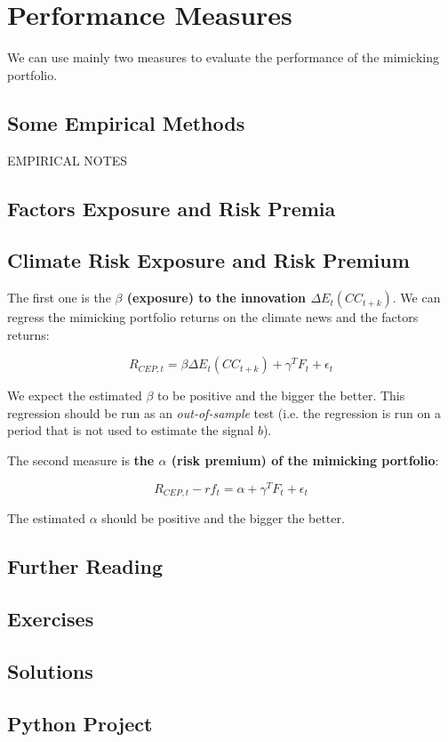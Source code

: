 \chapter{Performance Measures}

We can use mainly two measures to evaluate the performance of the mimicking portfolio. 

\section{Some Empirical Methods}

EMPIRICAL NOTES

\section{Factors Exposure and Risk Premia}

\section{Climate Risk Exposure and Risk Premium}

The first one is the \textbf{$\beta$ (exposure) to the innovation $\Delta E_t(CC_{t+k})$}.
We can regress the mimicking portfolio returns on the 
climate news and the factors returns:

\begin{equation}
    R_{CEP,t} = \beta \Delta E_t(CC_{t+k}) + \gamma^T F_t + \epsilon_t
\end{equation}

We expect the estimated $\beta$ to be positive and the bigger the better.
This regression should be run as an \textit{out-of-sample} test (i.e. the regression is run on a period that is not used to estimate the signal $b$).


The second measure is \textbf{the $\alpha$ (risk premium) of the mimicking portfolio}:

\begin{equation}
    R_{CEP,t} - rf_t = \alpha + \gamma^T F_t + \epsilon_t
\end{equation}

The estimated $\alpha$ should be positive and the bigger the better.

\section{Further Reading}

\section{Exercises}

\section{Solutions}

\section{Python Project}